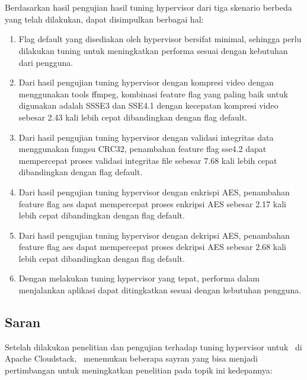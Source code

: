\chapter{\babLima}

Berdasarkan hasil pengujian hasil tuning hypervisor dari tiga skenario berbeda yang telah dilakukan, dapat disimpulkan berbagai hal:

\begin{enumerate}
	\item Flag default yang disediakan oleh hypervisor bersifat minimal, sehingga perlu dilakukan tuning untuk meningkatkan performa sesuai dengan kebutuhan dari pengguna.
	\item Dari hasil pengujian tuning hypervisor dengan kompresi video dengan menggunakan tools ffmpeg, kombinasi feature flag yang paling baik untuk digunakan adalah SSSE3 dan SSE4.1 dengan kecepatan kompresi video sebesar 2.43 kali lebih cepat dibandingkan dengan flag default.
	\item Dari hasil pengujian tuning hypervisor dengan validasi integritas data menggunakan fungsu CRC32, penambahan feature flag sse4.2 dapat mempercepat proses validasi integritas file sebesar 7.68 kali lebih cepat dibandingkan dengan flag default.
	\item Dari hasil pengujian tuning hypervisor dengan enkrispi AES, penambahan feature flag aes dapat mempercepat proses enkripsi AES sebesar 2.17 kali lebih cepat dibandingkan dengan flag default.
	\item Dari hasil pengujian tuning hypervisor dengan dekripsi AES, penambahan feature flag aes dapat mempercepat proses dekripsi AES sebesar 2.68 kali lebih cepat dibandingkan dengan flag default.
	\item Dengan melakukan tuning hypervisor yang tepat, performa dalam menjalankan aplikasi dapat ditingkatkan sesuai dengan kebutuhan pengguna.
\end{enumerate}

\section{Saran}
Setelah dilakukan penelitian dan pengujian terhadap tuning hypervisor untuk \vm\ di Apache Cloudstack, \saya\ menemukan beberapa sayran yang bisa menjadi pertimbangan untuk meningkatkan penelitian pada topik ini kedepannya:

